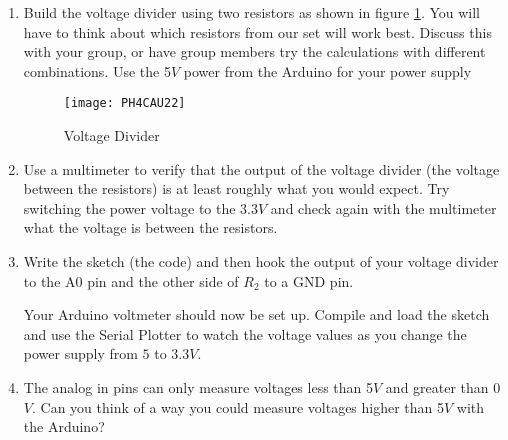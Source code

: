 	\begin{enumerate}
		\item Build the voltage divider using two resistors as shown in figure \ref{VoltageDivider}. You will have to think about which resistors from our set will work best. Discuss this with your group, or have group members try the calculations with different combinations. Use the 5$\unit{V}$ power from the Arduino for your power supply
		\begin{figure}[h!]
			\caption{Voltage Divider\label{VoltageDivider}}
			\texttt{[image: PH4CAU22]}
		\end{figure}
		
		\item Use a multimeter to verify that the output of the voltage divider (the voltage between the resistors) is at least roughly what you would expect.  Try switching the power voltage to the 3.3$\unit{V}$ and check again with the multimeter what the voltage is between the resistors.
		
		
		\item Write the sketch (the code) and then hook the output of your voltage divider to the A0 pin and the other side of $ R_{2} $ to a GND pin.

		Your Arduino voltmeter should now be set up. Compile and load the sketch and use the Serial Plotter to watch the voltage values as you change the power supply from $5$ to $3.3\unit{V}$. 
		
		
		
		\item The analog in pins can only measure voltages less than 5$\unit{V}$ and greater than 0$\unit{V}$. Can you think of a way you could measure voltages higher than 5$\unit{V}$ with the Arduino?
		
	\end{enumerate}






